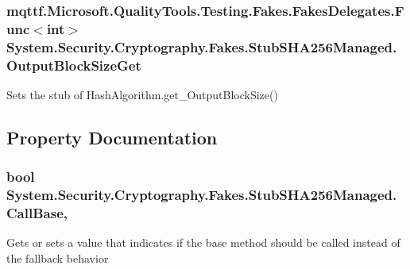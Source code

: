\hypertarget{class_system_1_1_security_1_1_cryptography_1_1_fakes_1_1_stub_s_h_a256_managed_af8bf0ccac09d00a33a3637ead9e22102}{
\subsubsection[{Output\-Block\-Size\-Get}]{\setlength{\rightskip}{0pt plus 5cm}mqttf.\-Microsoft.\-Quality\-Tools.\-Testing.\-Fakes.\-Fakes\-Delegates.\-Func$<$int$>$ System.\-Security.\-Cryptography.\-Fakes.\-Stub\-S\-H\-A256\-Managed.\-Output\-Block\-Size\-Get}}\label{class_system_1_1_security_1_1_cryptography_1_1_fakes_1_1_stub_s_h_a256_managed_af8bf0ccac09d00a33a3637ead9e22102}


Sets the stub of Hash\-Algorithm.\-get\-\_\-\-Output\-Block\-Size()



\subsection{Property Documentation}
\hypertarget{class_system_1_1_security_1_1_cryptography_1_1_fakes_1_1_stub_s_h_a256_managed_af4468477026db07a4449f10eb3410f34}{
\subsubsection[{Call\-Base}]{\setlength{\rightskip}{0pt plus 5cm}bool System.\-Security.\-Cryptography.\-Fakes.\-Stub\-S\-H\-A256\-Managed.\-Call\-Base\hspace{0.3cm}{\ttfamily [get]}, {\ttfamily [set]}}}\label{class_system_1_1_security_1_1_cryptography_1_1_fakes_1_1_stub_s_h_a256_managed_af4468477026db07a4449f10eb3410f34}


Gets or sets a value that indicates if the base method should be called instead of the fallback behavior

